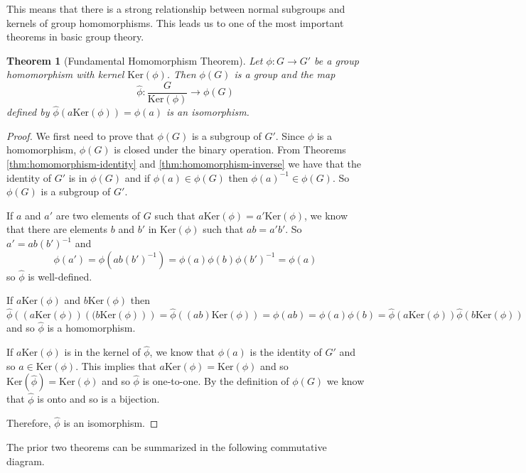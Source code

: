 \documentclass[
]{book}
\newtheorem{theorem}{Theorem}[chapter]
\theoremstyle{definition}
\theoremstyle{definition}
\theoremstyle{definition}
\theoremstyle{definition}
\theoremstyle{remark}
\begin{document}
This means that there is a strong relationship between normal subgroups and kernels of group homomorphisms. This leads us to one of the most important theorems in basic group theory.

\begin{theorem}[Fundamental Homomorphism Theorem]
Let \(\phi: G \rightarrow G'\) be a group homomorphism with kernel \(\mbox{Ker}(\phi)\). Then \(\phi(G)\) is a group and the map
\[\hat{\phi} : \frac{G}{\mbox{Ker}(\phi)} \rightarrow \phi(G)\] defined by \(\hat{\phi} \left( a \mbox{Ker}(\phi)\right) = \phi(a)\) is an isomorphism.
\end{theorem}

\begin{proof}
We first need to prove that \(\phi(G)\) is a subgroup of \(G'\). Since \(\phi\) is a homomorphism, \(\phi(G)\) is closed under the binary operation. From Theorems \ref{thm:homomorphism-identity} and \ref{thm:homomorphism-inverse} we have that the identity of \(G'\) is in \(\phi(G)\) and if \(\phi(a)\in \phi(G)\) then \(\phi(a)^{-1}\in \phi(G)\). So \(\phi(G)\) is a subgroup of \(G'\).

If \(a\) and \(a'\) are two elements of \(G\) such that \(a \mbox{Ker}(\phi) = a' \mbox{Ker}(\phi)\), we know that there are elements \(b\) and \(b'\) in \(\mbox{Ker}(\phi)\) such that \(a b = a' b'\). So \(a'= ab (b')^{-1}\) and \[\phi(a') = \phi(ab (b')^{-1}) = \phi(a) \phi(b) \phi(b')^{-1} = \phi(a)\] so \(\hat{\phi}\) is well-defined.

If \(a \mbox{Ker}(\phi)\) and \(b \mbox{Ker}(\phi)\) then \[\hat{\phi} \left( \left(a \mbox{Ker}(\phi) \right) \left((b \mbox{Ker}(\phi)\right) \right) = \hat{\phi} \left( (ab) \mbox{Ker}(\phi) \right) = \phi(ab) = \phi(a) \phi(b) = \hat{\phi}\left( a \mbox{Ker}(\phi)\right) \hat{\phi} \left(b \mbox{Ker}(\phi)\right)\] and so \(\hat{\phi}\) is a homomorphism.

If \(a \mbox{Ker}(\phi)\) is in the kernel of \(\hat{\phi}\), we know that \(\phi(a)\) is the identity of \(G'\) and so \(a\in \mbox{Ker}(\phi)\). This implies that \(a \mbox{Ker}(\phi)= \mbox{Ker}(\phi)\) and so \(\mbox{Ker}(\hat{\phi}) = \mbox{Ker}(\phi)\) and so \(\hat{\phi}\) is one-to-one. By the definition of \(\phi(G)\) we know that \(\hat{\phi}\) is onto and so is a bijection.

Therefore, \(\hat{\phi}\) is an isomorphism.
\end{proof}

The prior two theorems can be summarized in the following commutative diagram.
\end{document}
